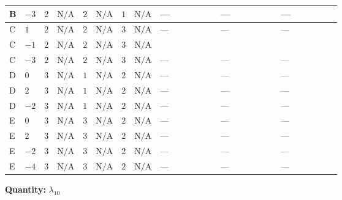 \documentclass[8pt]{article}
\begin{document}
\begin{landscape}
\begin{longtable}{@{}llcccccc >{\raggedright\arraybackslash}p{0.21\linewidth} >{\raggedright\arraybackslash}p{0.21\linewidth} >{\raggedright\arraybackslash}p{0.21\linewidth}@{}}
\midrule
B & $-3$ & $2$ & $\text{N/A}$ & $2$ & $\text{N/A}$ & $1$ & $\text{N/A}$ & --- & --- & --- \\
\midrule
C & $1$ & $2$ & $\text{N/A}$ & $2$ & $\text{N/A}$ & $3$ & $\text{N/A}$ & --- & --- & --- \\
\midrule
C & $-1$ & $2$ & $\text{N/A}$ & $2$ & $\text{N/A}$ & $3$ & $\text{N/A}$ & \scriptsize\adjustbox{max width=\linewidth}{$\begin{gathered} 4 {\lambda_{9}} (5 \left({\lambda_{10}}\right)^{*}+\left({\lambda_{11}}\right)^{*})\end{gathered}$} & \scriptsize\adjustbox{max width=\linewidth}{$\begin{gathered} -9 {g_2}^2 {\lambda_{10}}\end{gathered}$} & \scriptsize\adjustbox{max width=\linewidth}{$\begin{gathered} -3 {g_1}^2 {\lambda_{10}}\end{gathered}$} \\
\midrule
C & $-3$ & $2$ & $\text{N/A}$ & $2$ & $\text{N/A}$ & $3$ & $\text{N/A}$ & --- & --- & --- \\
\midrule
D & $0$ & $3$ & $\text{N/A}$ & $1$ & $\text{N/A}$ & $2$ & $\text{N/A}$ & --- & --- & --- \\
\midrule
D & $2$ & $3$ & $\text{N/A}$ & $1$ & $\text{N/A}$ & $2$ & $\text{N/A}$ & --- & --- & --- \\
\midrule
D & $-2$ & $3$ & $\text{N/A}$ & $1$ & $\text{N/A}$ & $2$ & $\text{N/A}$ & --- & --- & --- \\
\midrule
E & $0$ & $3$ & $\text{N/A}$ & $3$ & $\text{N/A}$ & $2$ & $\text{N/A}$ & --- & --- & --- \\
\midrule
E & $2$ & $3$ & $\text{N/A}$ & $3$ & $\text{N/A}$ & $2$ & $\text{N/A}$ & --- & --- & --- \\
\midrule
E & $-2$ & $3$ & $\text{N/A}$ & $3$ & $\text{N/A}$ & $2$ & $\text{N/A}$ & --- & --- & --- \\
\midrule
E & $-4$ & $3$ & $\text{N/A}$ & $3$ & $\text{N/A}$ & $2$ & $\text{N/A}$ & --- & --- & --- \\
\midrule
\bottomrule
\end{longtable}
\clearpage
\noindent\textbf{Quantity: }$\lambda_{10}$\par\smallskip

\end{landscape}
\end{document}
